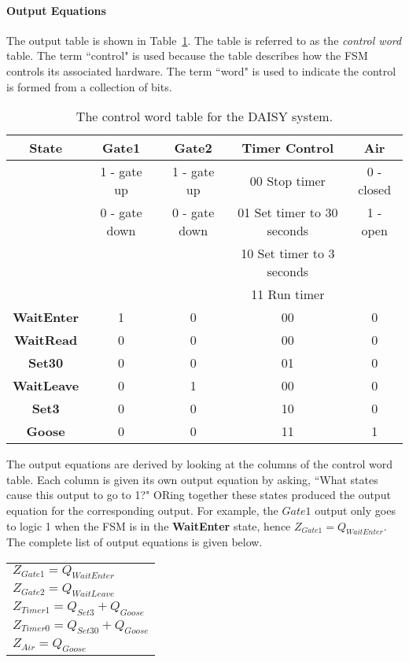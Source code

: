 \paragraph{Output Equations}
The output table is shown in Table~\ref{table:daisy}.  The table is
referred to as the \textit{ control word} table.  The term
``control" is used because the table describes how the FSM controls
its associated hardware.  The term ``word" is used to indicate
the control is formed from a collection of bits.

\begin{table}[ht]
    {\small
        \begin{tabular}{c||c|c|c|c}
            State                  & Gate1         & Gate2         & Timer Control              & Air        \\ \hline \hline
            & 1 - gate up   & 1 - gate up   & 00 Stop timer              & 0 - closed \\ \hline
            & 0 - gate down & 0 - gate down & 01 Set timer to 30 seconds & 1 - open   \\ \hline
            &               &               & 10 Set timer to 3 seconds  &            \\ \hline
            &               &               & 11 Run timer               &            \\ \hline \hline
            \textbf{ WaitEnter}    & 1             & 0             & 00                         & 0          \\ \hline
            \textbf{ WaitRead}     & 0             & 0             & 00                         & 0          \\ \hline
            \textbf{ Set30}        & 0             & 0             & 01                         & 0          \\ \hline
            \textbf{ WaitLeave}    & 0             & 1             & 00                         & 0          \\ \hline
            \textbf{ Set3}         & 0             & 0             & 10                         & 0          \\ \hline
            \textbf{ Goose}        & 0             & 0             & 11                         & 1          \\
        \end{tabular}
    }
    \caption{The control word table for the DAISY system.}
    \label{table:daisy}
\end{table}

The output equations are derived by looking at the columns
of the control word table.  Each column is given its own
output equation by asking, ``What states cause this
output to go to 1?"  ORing together these states produced
the output equation for the corresponding output.  For
example, the $Gate1$ output only goes to logic 1 when the
FSM is in the \textbf{ WaitEnter} state, hence
$Z_{Gate1} = Q_{WaitEnter}$.  The complete list of output
equations is given below.

\begin{tabular}{l}

    $Z_{Gate1}    = Q_{WaitEnter}$  \\
    $Z_{Gate2}    = Q_{WaitLeave}$ \\
    $Z_{Timer1}    = Q_{Set3} + Q_{Goose}$ \\
    $Z_{Timer0}    = Q_{Set30} + Q_{Goose}$ \\
    $Z_{Air}    = Q_{Goose}$ \\
\end{tabular}
